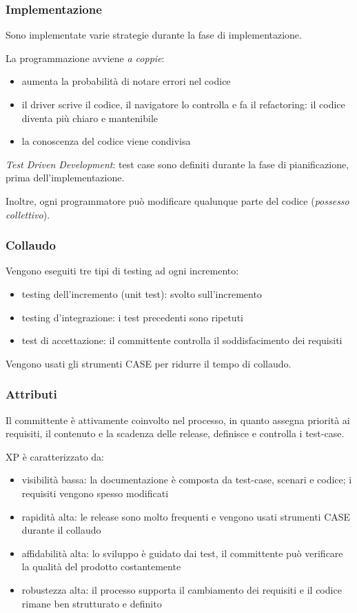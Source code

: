 \documentclass[11pt]{article}
\begin{document}
\subsubsection*{Implementazione}
Sono implementate varie strategie durante la fase di implementazione.

La programmazione avviene \textit{a coppie}:
\begin{itemize}
    \item aumenta la probabilità di notare errori nel codice 
    \item il driver scrive il codice, il navigatore lo controlla e fa il refactoring: il codice diventa più chiaro e 
    mantenibile
    \item la conoscenza del codice viene condivisa 
\end{itemize}

\textit{Test Driven Development}: test case sono definiti durante la fase di pianificazione, prima dell'implementazione.

Inoltre, ogni programmatore può modificare qualunque parte del codice (\textit{possesso collettivo}).
\subsubsection*{Collaudo}
Vengono eseguiti tre tipi di testing ad ogni incremento:
\begin{itemize}
    \item testing dell'incremento (unit test): svolto sull'incremento
    \item testing d'integrazione: i test precedenti sono ripetuti
    \item test di accettazione: il committente controlla il soddisfacimento dei requisiti
\end{itemize}
Vengono usati gli strumenti CASE per ridurre il tempo di collaudo.
\subsubsection*{Attributi}
Il committente è attivamente coinvolto nel processo, in quanto assegna priorità ai requisiti, il contenuto e la scadenza 
delle release, definisce e controlla i test-case.

XP è caratterizzato da:
\begin{itemize}
    \item visibilità bassa: la documentazione è composta da test-case, scenari e codice; i requisiti vengono spesso 
    modificati
    \item rapidità alta: le release sono molto frequenti e vengono usati strumenti CASE durante il collaudo 
    \item affidabilità alta: lo sviluppo è guidato dai test, il committente può verificare la qualità del prodotto 
    costantemente
    \item robustezza alta: il processo supporta il cambiamento dei requisiti e il codice rimane ben strutturato e definito
\end{itemize}
\end{document}
